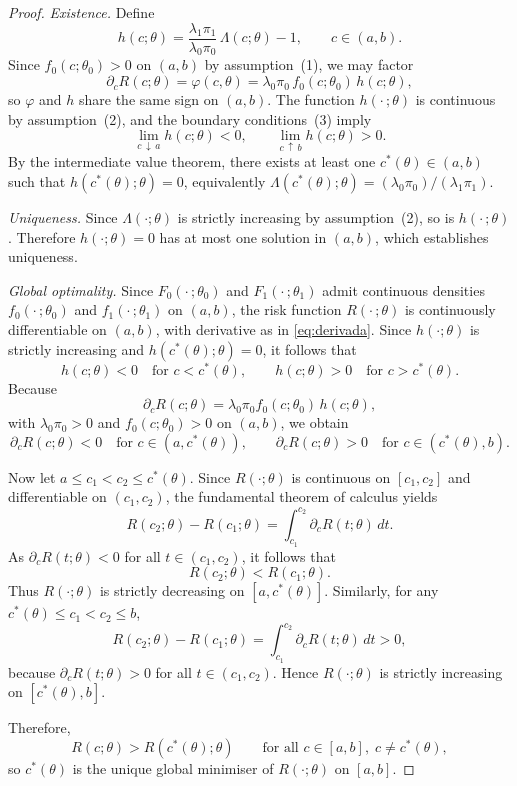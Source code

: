 \documentclass[11pt,a4paper]{article}
\theoremstyle{definition}
\theoremstyle{remark}
\newcommand{\1}{\mathbf{1}}
\begin{document}
\begin{proof}
\textit{Existence.}
Define
\[
h(c;\theta)
=
\frac{\lambda_1\pi_1}{\lambda_0\pi_0}\,\Lambda(c;\theta)-1,
\qquad c\in(a,b).
\]
Since $f_0(c;\theta_0)>0$ on $(a,b)$ by assumption~(1),
we may factor
\begin{equation}\label{eq:derivada}
\partial_c R(c;\theta)=\varphi(c,\theta)
=
\lambda_0\pi_0\,f_0(c;\theta_0)\,h(c;\theta),   
\end{equation}
so $\varphi$ and $h$ share the same sign on $(a,b)$.
The function $h(\cdot\,;\theta)$ is continuous by
assumption~(2), and the boundary conditions~(3) imply
\[
\lim_{c\,\downarrow\, a}h(c;\theta)<0,
\qquad
\lim_{c\,\uparrow\, b}h(c;\theta)>0.
\]
By the intermediate value theorem, there exists at least one
$c^*(\theta)\in(a,b)$ such that $h(c^*(\theta);\theta)=0$, equivalently
$\Lambda(c^*(\theta);\theta)=(\lambda_0\pi_0)/(\lambda_1\pi_1)$.

\medskip
\noindent
\textit{Uniqueness.}
Since $\Lambda(\cdot;\theta)$ is strictly increasing by
assumption~(2), so is $h(\cdot\,;\theta)$.
Therefore $h(\cdot;\theta)=0$ has at most one solution in
$(a,b)$, which establishes uniqueness.

\medskip
\noindent
\textit{Global optimality.}
Since $F_0(\cdot\,;\theta_0)$ and $F_1(\cdot\,;\theta_1)$ admit continuous
densities $f_0(\cdot\,;\theta_0)$ and $f_1(\cdot\,;\theta_1)$ on $(a,b)$,
the risk function $R(\cdot\,;\theta)$ is continuously differentiable on
$(a,b)$, with derivative as in \eqref{eq:derivada}. Since $h(\cdot;\theta)$ is strictly increasing and
$h(c^*(\theta);\theta)=0$, it follows that
\[
h(c;\theta)<0 \quad \text{for } c<c^*(\theta),
\qquad
h(c;\theta)>0 \quad \text{for } c>c^*(\theta).
\]
Because
\[
\partial_c R(c;\theta)
=
\lambda_0\pi_0 f_0(c;\theta_0)\,h(c;\theta),
\]
with $\lambda_0\pi_0>0$ and $f_0(c;\theta_0)>0$ on $(a,b)$,
we obtain
\[
\partial_c R(c;\theta)<0 \quad \text{for } c\in(a,c^*(\theta)),
\qquad
\partial_c R(c;\theta)>0 \quad \text{for } c\in(c^*(\theta),b).
\]

\noindent
Now let $a\le c_1<c_2\le c^*(\theta)$. Since $R(\cdot;\theta)$ is
continuous on $[c_1,c_2]$ and differentiable on $(c_1,c_2)$, the
fundamental theorem of calculus yields
\[
R(c_2;\theta)-R(c_1;\theta)
=
\int_{c_1}^{c_2}\partial_c R(t;\theta)\,dt.
\]
As $\partial_c R(t;\theta)<0$ for all $t\in(c_1,c_2)$, it follows that
\[
R(c_2;\theta)<R(c_1;\theta).
\]
Thus $R(\cdot;\theta)$ is strictly decreasing on $[a,c^*(\theta)]$. Similarly, for any $c^*(\theta)\le c_1<c_2\le b$,
\[
R(c_2;\theta)-R(c_1;\theta)
=
\int_{c_1}^{c_2}\partial_c R(t;\theta)\,dt>0,
\]
because $\partial_c R(t;\theta)>0$ for all $t\in(c_1,c_2)$.
Hence $R(\cdot;\theta)$ is strictly increasing on $[c^*(\theta),b]$.

\noindent
Therefore,
\[
R(c;\theta)>R(c^*(\theta);\theta)
\qquad\text{for all } c\in[a,b],\; c\neq c^*(\theta),
\]
so $c^*(\theta)$ is the unique global minimiser of $R(\cdot;\theta)$ on $[a,b]$.
\end{proof}
\end{document}
